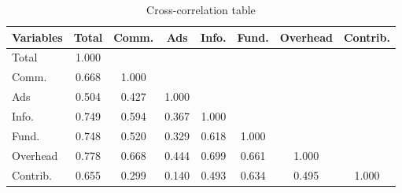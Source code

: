 \begin{table}[htbp]\centering \caption{Cross-correlation table\label{corrtable}}
\begin{tabular}{l  c  c  c  c  c  c  c }\hline\hline
\multicolumn{1}{c}{Variables} &Total&Comm.&Ads&Info.&Fund.&Overhead&Contrib.\\ \hline
Total&1.000\\
Comm.&0.668&1.000\\
Ads&0.504&0.427&1.000\\
Info.&0.749&0.594&0.367&1.000\\
Fund.&0.748&0.520&0.329&0.618&1.000\\
Overhead&0.778&0.668&0.444&0.699&0.661&1.000\\
Contrib.&0.655&0.299&0.140&0.493&0.634&0.495&1.000\\
\hline \hline 
 \end{tabular}
\end{table}
